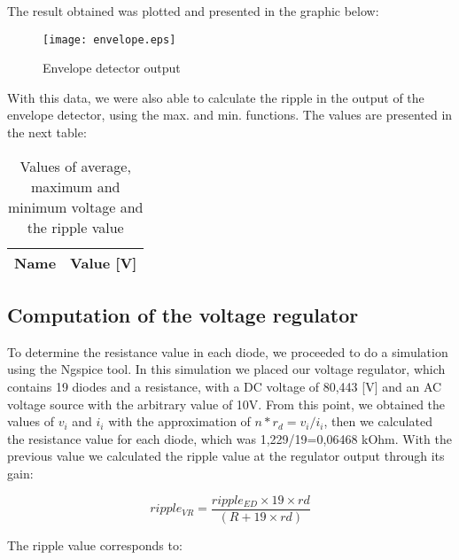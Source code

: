 \vspace{0.3in}
The result obtained was plotted and presented in the graphic below:


\begin{figure}[h] \centering
\texttt{[image: envelope.eps]}
\caption{Envelope detector output}
\label{fig:rc2}
\end{figure} 

\vspace{0.3in}
With this data, we were also able to calculate the ripple in the output of the envelope detector, using the max. and min. functions. The values are presented in the next table: 


\vspace{0.3in}
\begin{table}[ht]
  \centering
  \begin{tabular}{|l|r|}
    \hline    
    {\bf Name} & {\bf Value [V]} \\ \hline
    
  \end{tabular}
  \caption{Values of average, maximum and minimum voltage and the ripple value}
  \label{tab:1}
\end{table}

\newpage
\subsection{Computation of the voltage regulator}

To determine the resistance value in each diode, we proceeded to do a simulation using the Ngspice tool. In this simulation we placed our voltage regulator, which contains 19 diodes and a resistance, with a DC voltage of 80,443 [V] and an AC voltage source with the arbitrary value of 10V.\newline
From this point, we obtained the values of $v_i$ and $i_i$ with the approximation of $n*r_d=v_i/i_i$, then we calculated the resistance value for each diode, which was 1,229/19=0,06468 kOhm.
With the previous value we calculated the ripple value at the regulator output through its gain:

\vspace{0.2in}
\begin{equation}
 ripple_{VR}=\frac{ripple_{ED}\times 19\times rd}{(R+19\times rd)}   
\end{equation}
\vspace{0.2in}


The ripple value corresponds to:


